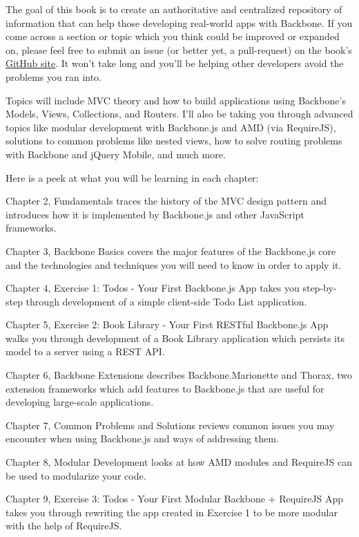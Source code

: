 \documentclass[9pt]{book}
\begin{document}
The goal of this book is to create an authoritative and centralized
repository of information that can help those developing real-world apps
with Backbone. If you come across a section or topic which you think
could be improved or expanded on, please feel free to submit an issue
(or better yet, a pull-request) on the book's
\href{https://github.com/addyosmani/backbone-fundamentals}{GitHub site}.
It won't take long and you'll be helping other developers avoid the
problems you ran into.

Topics will include MVC theory and how to build applications using
Backbone's Models, Views, Collections, and Routers. I'll also be taking
you through advanced topics like modular development with Backbone.js
and AMD (via RequireJS), solutions to common problems like nested views,
how to solve routing problems with Backbone and jQuery Mobile, and much
more.

Here is a peek at what you will be learning in each chapter:

Chapter 2, Fundamentals traces the history of the MVC design pattern and
introduces how it is implemented by Backbone.js and other JavaScript
frameworks.

Chapter 3, Backbone Basics covers the major features of the Backbone.js
core and the technologies and techniques you will need to know in order
to apply it.

Chapter 4, Exercise 1: Todos - Your First Backbone.js App takes you
step-by-step through development of a simple client-side Todo List
application.

Chapter 5, Exercise 2: Book Library - Your First RESTful Backbone.js App
walks you through development of a Book Library application which
persists its model to a server using a REST API.

Chapter 6, Backbone Extensions describes Backbone.Marionette and Thorax,
two extension frameworks which add features to Backbone.js that are
useful for developing large-scale applications.

Chapter 7, Common Problems and Solutions reviews common issues you may
encounter when using Backbone.js and ways of addressing them.

Chapter 8, Modular Development looks at how AMD modules and RequireJS
can be used to modularize your code.

Chapter 9, Exercise 3: Todos - Your First Modular Backbone + RequireJS
App takes you through rewriting the app created in Exercise 1 to be more
modular with the help of RequireJS.
\end{document}
